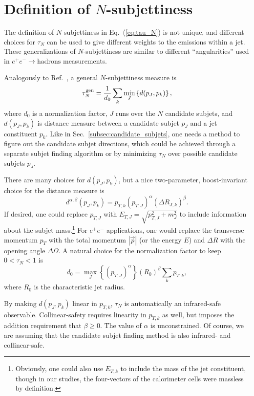 \documentclass{JHEP3}
\DeclareRobustCommand{\Sec}[1]{Sec.~\ref{#1}}
\DeclareRobustCommand{\Eq}[1]{Eq.~(\ref{#1})}
\DeclareRobustCommand{\Ref}[1]{Ref.~\cite{#1}}
\newcommand{\be}{\begin{equation}}
\newcommand{\ee}{\end{equation}}
\begin{document}
\appendix

\newpage

\section{Definition of $N$-subjettiness}
\label{app:Nsubdef}

The definition of $N$-subjettiness in \Eq{eq:tau_N} is not unique, and different choices for $\tau_N$ can be used to give different weights to the emissions within a jet.  These generalizations of $N$-subjettiness are similar to different ``angularities'' \cite{Berger:2003iw} used in $e^+ e^- \rightarrow \text{hadrons}$ measurements.  

Analogously to \Ref{Stewart:2010tn}, a general $N$-subjettiness measure is
\be
\label{eq:tauNgen}
\tau_N^{\rm gen} = \frac{1}{d_0}\sum_k \min_{J} \left\{d(p_J,p_k) \right\},
\ee
where $d_0$ is a normalization factor, $J$ runs over the $N$ candidate subjets, and $d(p_J,p_k)$ is distance measure between a candidate subjet $p_J$ and a jet constituent $p_k$.  Like in \Sec{subsec:candidate_subjets}, one needs a method to figure out the candidate subjet directions, which could be achieved through a separate subjet finding algorithm or by minimizing $\tau_N$ over possible candidate subjets $p_J$.

There are many choices for $d(p_J,p_k)$, but a nice two-parameter, boost-invariant choice for the distance measure is
\be
d^{\alpha, \beta}(p_J,p_k) = p_{T,k}  \left(p_{T,J}\right)^\alpha \left(\Delta R_{J,k} \right)^\beta.
\ee
If desired, one could replace $p_{T,J}$ with $E_{T,J} = \sqrt{p_{T,J}^2 + m_J^2}$ to include information about the subjet mass.\footnote{Obviously, one could also use $E_{T,k}$ to include the mass of the jet constituent, though in our studies, the four-vectors of the calorimeter cells were massless by definition.}  For $e^+ e^-$ applications, one would replace the transverse momentum $p_T$ with the total momentum $|\vec{p}|$ (or the energy $E$) and $\Delta R$ with the opening angle $\Delta \Omega$.  A natural choice for the normalization factor to keep $0< \tau_N < 1$ is
\be
d_0 = \max_{J} \left\{ \left(p_{T,J}\right)^\alpha  \right\} \left(R_0 \right)^\beta \sum_k p_{T,k}  ,
\ee 
where $R_0$ is the characteristic jet radius.

By making $d(p_J,p_k)$ linear in $p_{T,k}$, $\tau_N$ is automatically an infrared-safe observable. Collinear-safety requires linearity in $p_{T,k}$ as well, but imposes the addition requirement that $\beta \geq 0$.  The value of $\alpha$ is unconstrained.  Of course, we are assuming that the candidate subjet finding method is also infrared- and collinear-safe.
\end{document}
